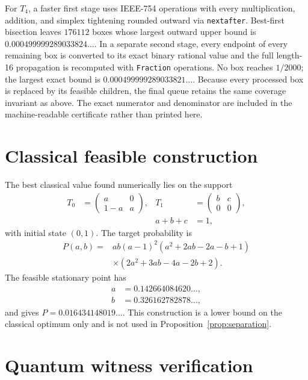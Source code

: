 \documentclass[a4paper,twocolumn,11pt,unpublished]{quantumarticle}
\begin{document}
For $T_4$, a faster first stage uses IEEE-754 operations with every
multiplication, addition, and simplex tightening rounded outward via
\texttt{nextafter}.  Best-first bisection leaves $176112$ boxes whose largest
outward upper bound is $0.000499999289033824\ldots$.  In a separate second
stage, every endpoint of every remaining box is converted to its exact
binary rational value and the full length-16 propagation is recomputed with
\texttt{Fraction} operations.  No box reaches $1/2000$; the largest exact
bound is $0.000499999289033821\ldots$.  Because every processed box is
replaced by its feasible children, the final queue retains the same coverage
invariant as above.  The exact numerator and denominator are included in the
machine-readable certificate rather than printed here.

\section{Classical feasible construction}

The best classical value found numerically lies on the support
\[
\begin{aligned}
T_0&=\begin{pmatrix}a&0\\1-a&a\end{pmatrix},&
T_1&=\begin{pmatrix}b&c\\0&0\end{pmatrix},\\
&&a+b+c&=1,
\end{aligned}
\]
with initial state $(0,1)$.  The target probability is
\begin{align}
P(a,b)={}&ab(a-1)^2(a^2+2ab-2a-b+1)\nonumber\\
&\times(2a^2+3ab-4a-2b+2).
\end{align}
The feasible stationary point has
\[
\begin{aligned}
a&=0.142664084620\ldots,\\
b&=0.326162782878\ldots,
\end{aligned}
\]
and gives $P=0.016434148019\ldots$.  This construction is a lower bound on the
classical optimum only and is not used in Proposition~\ref{prop:separation}.

\section{Quantum witness verification}
\label{app:quantum}
\end{document}

